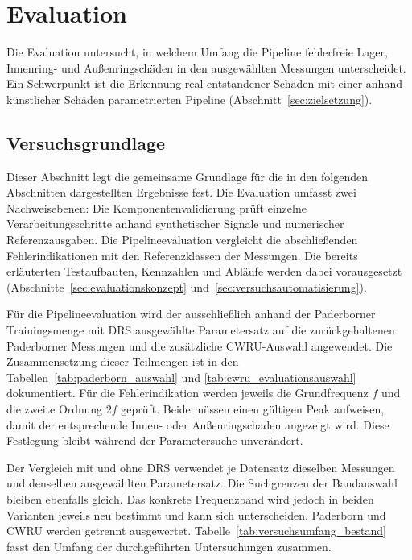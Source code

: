 \chapter{Evaluation}
\label{ch:evaluation}

Die Evaluation untersucht, in welchem Umfang die Pipeline fehlerfreie Lager,
Innenring- und Außenringschäden in den ausgewählten Messungen unterscheidet.
Ein Schwerpunkt ist die Erkennung real entstandener Schäden mit einer anhand
künstlicher Schäden parametrierten Pipeline
(Abschnitt~\ref{sec:zielsetzung}).

\section{Versuchsgrundlage}
\label{sec:versuchsaufbau}

Dieser Abschnitt legt die gemeinsame Grundlage für die in den folgenden
Abschnitten dargestellten Ergebnisse fest. Die Evaluation umfasst zwei
Nachweisebenen: Die Komponentenvalidierung prüft einzelne
Verarbeitungsschritte anhand synthetischer Signale und numerischer
Referenzausgaben. Die Pipelineevaluation vergleicht die abschließenden
Fehlerindikationen mit den Referenzklassen der Messungen. Die bereits
erläuterten Testaufbauten, Kennzahlen und Abläufe werden dabei vorausgesetzt
(Abschnitte~\ref{sec:evaluationskonzept}
und~\ref{sec:versuchsautomatisierung}).

Für die Pipelineevaluation wird der ausschließlich anhand der Paderborner
Trainingsmenge mit DRS ausgewählte Parametersatz auf die zurückgehaltenen
Paderborner Messungen und die zusätzliche CWRU-Auswahl angewendet. Die
Zusammensetzung dieser Teilmengen ist in den
Tabellen~\ref{tab:paderborn_auswahl} und \ref{tab:cwru_evaluationsauswahl}
dokumentiert.
Für die Fehlerindikation werden jeweils die Grundfrequenz $f$ und die zweite
Ordnung $2f$ geprüft. Beide müssen einen gültigen Peak aufweisen, damit der
entsprechende Innen- oder Außenringschaden angezeigt wird. Diese Festlegung
bleibt während der Parametersuche unverändert.

Der Vergleich mit und ohne DRS verwendet je Datensatz dieselben Messungen
und denselben ausgewählten Parametersatz. Die Suchgrenzen der Bandauswahl
bleiben ebenfalls gleich. Das konkrete Frequenzband wird jedoch in beiden
Varianten jeweils neu bestimmt und kann sich unterscheiden. Paderborn und
CWRU werden getrennt ausgewertet.
Tabelle~\ref{tab:versuchsumfang_bestand} fasst den Umfang der durchgeführten
Untersuchungen zusammen.

